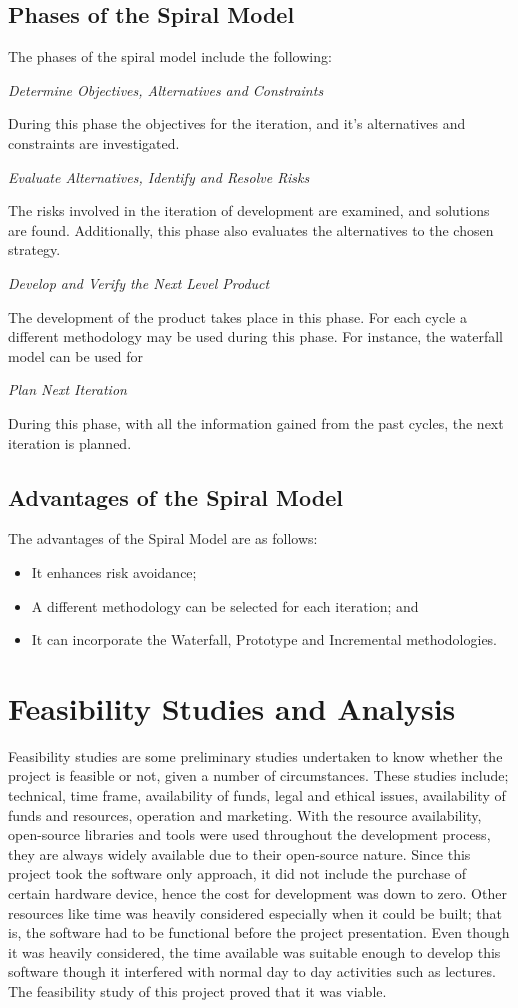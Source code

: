 \subsection{Phases of the Spiral Model}
The phases of the spiral model include the following:

\textit{Determine Objectives, Alternatives and Constraints}

During this phase the objectives for the iteration, and it's alternatives and constraints are investigated.

\textit{Evaluate Alternatives, Identify and Resolve Risks}

The risks involved in the iteration of development are examined, and solutions are found. Additionally, this phase also evaluates the alternatives to the chosen strategy.

\textit{Develop and Verify the Next Level Product}

The development of the product takes place in this phase. For each cycle a different methodology may be used during this phase. For instance, the waterfall model can be used for 

\textit{Plan Next Iteration}

During this phase, with all the information gained from the past cycles, the next iteration is planned.

\subsection{Advantages of the Spiral Model}
The advantages of the Spiral Model are as follows:
\begin{itemize}
	\item It enhances risk avoidance;
	\item A different methodology can be selected for each iteration; and 
	\item It can incorporate the Waterfall, Prototype and Incremental methodologies.
\end{itemize}

\section{Feasibility Studies and Analysis}
Feasibility studies are some preliminary studies undertaken to know whether the project is feasible or not, given a number of circumstances. These studies include; technical, time frame, availability of funds, legal and ethical issues, availability of funds and resources, operation and marketing. With the resource availability, open-source libraries and tools were used throughout the development process, they are always widely available due to their open-source nature. Since this project took the software only approach, it did not include the purchase of certain hardware device, hence the cost for development was down to zero. Other resources like time was heavily considered especially when it could be built; that is, the software had to be functional before the project presentation. Even though it was heavily considered, the time available was suitable enough to develop this software though it interfered with normal day to day activities such as lectures. The feasibility study of this project proved that it was viable.


